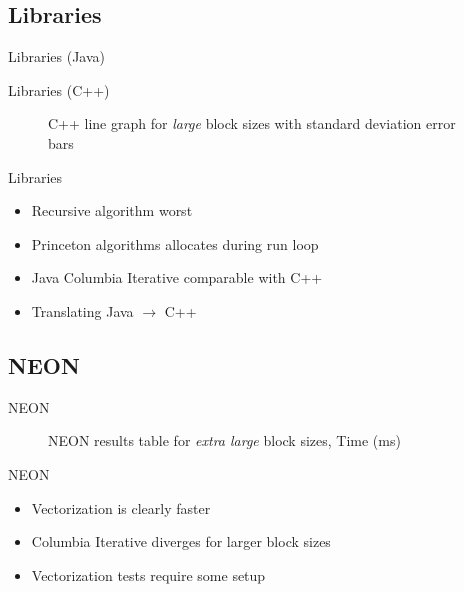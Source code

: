 \documentclass[xcolor={table}]{beamer}
\begin{document}
\subsection{Libraries}
\begin{frame}{Libraries (Java)}
    \begin{table}
        \centering
        
        \caption{Java line graph for \emph{large} block sizes with standard deviation error bars}
    \end{table}
\end{frame}
\begin{frame}{Libraries (C++)}
    \begin{figure}
        \centering
        
        \caption{C++ line graph for \emph{large} block sizes with standard deviation error bars}
    \end{figure}
\end{frame}
\begin{frame}{Libraries}
    \begin{itemize}
        \item Recursive algorithm worst
        \item Princeton algorithms allocates during run loop
        \item Java Columbia Iterative comparable with C++
        \item Translating Java $\rightarrow$ C++
    \end{itemize}
\end{frame}

\subsection{NEON}
\begin{frame}{NEON}
    \begin{figure}
        \centering
        
        \caption{NEON results table for \emph{extra large} block sizes, Time (ms)}
    \end{figure}
\end{frame}

\begin{frame}{NEON}
    \begin{itemize}
        \item Vectorization is clearly faster 
        \item Columbia Iterative diverges for larger block sizes
        \item Vectorization tests require some setup
    \end{itemize}
\end{frame}
\end{document}
